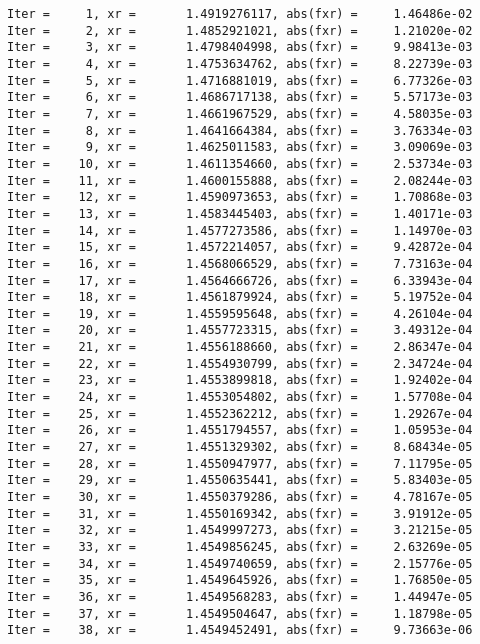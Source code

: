 \documentclass[11pt]{article}
\begin{document}
    \begin{Verbatim}[commandchars=\\\{\}]
Iter =     1, xr =       1.4919276117, abs(fxr) =     1.46486e-02
Iter =     2, xr =       1.4852921021, abs(fxr) =     1.21020e-02
Iter =     3, xr =       1.4798404998, abs(fxr) =     9.98413e-03
Iter =     4, xr =       1.4753634762, abs(fxr) =     8.22739e-03
Iter =     5, xr =       1.4716881019, abs(fxr) =     6.77326e-03
Iter =     6, xr =       1.4686717138, abs(fxr) =     5.57173e-03
Iter =     7, xr =       1.4661967529, abs(fxr) =     4.58035e-03
Iter =     8, xr =       1.4641664384, abs(fxr) =     3.76334e-03
Iter =     9, xr =       1.4625011583, abs(fxr) =     3.09069e-03
Iter =    10, xr =       1.4611354660, abs(fxr) =     2.53734e-03
Iter =    11, xr =       1.4600155888, abs(fxr) =     2.08244e-03
Iter =    12, xr =       1.4590973653, abs(fxr) =     1.70868e-03
Iter =    13, xr =       1.4583445403, abs(fxr) =     1.40171e-03
Iter =    14, xr =       1.4577273586, abs(fxr) =     1.14970e-03
Iter =    15, xr =       1.4572214057, abs(fxr) =     9.42872e-04
Iter =    16, xr =       1.4568066529, abs(fxr) =     7.73163e-04
Iter =    17, xr =       1.4564666726, abs(fxr) =     6.33943e-04
Iter =    18, xr =       1.4561879924, abs(fxr) =     5.19752e-04
Iter =    19, xr =       1.4559595648, abs(fxr) =     4.26104e-04
Iter =    20, xr =       1.4557723315, abs(fxr) =     3.49312e-04
Iter =    21, xr =       1.4556188660, abs(fxr) =     2.86347e-04
Iter =    22, xr =       1.4554930799, abs(fxr) =     2.34724e-04
Iter =    23, xr =       1.4553899818, abs(fxr) =     1.92402e-04
Iter =    24, xr =       1.4553054802, abs(fxr) =     1.57708e-04
Iter =    25, xr =       1.4552362212, abs(fxr) =     1.29267e-04
Iter =    26, xr =       1.4551794557, abs(fxr) =     1.05953e-04
Iter =    27, xr =       1.4551329302, abs(fxr) =     8.68434e-05
Iter =    28, xr =       1.4550947977, abs(fxr) =     7.11795e-05
Iter =    29, xr =       1.4550635441, abs(fxr) =     5.83403e-05
Iter =    30, xr =       1.4550379286, abs(fxr) =     4.78167e-05
Iter =    31, xr =       1.4550169342, abs(fxr) =     3.91912e-05
Iter =    32, xr =       1.4549997273, abs(fxr) =     3.21215e-05
Iter =    33, xr =       1.4549856245, abs(fxr) =     2.63269e-05
Iter =    34, xr =       1.4549740659, abs(fxr) =     2.15776e-05
Iter =    35, xr =       1.4549645926, abs(fxr) =     1.76850e-05
Iter =    36, xr =       1.4549568283, abs(fxr) =     1.44947e-05
Iter =    37, xr =       1.4549504647, abs(fxr) =     1.18798e-05
Iter =    38, xr =       1.4549452491, abs(fxr) =     9.73663e-06

\end{Verbatim}
\end{document}
